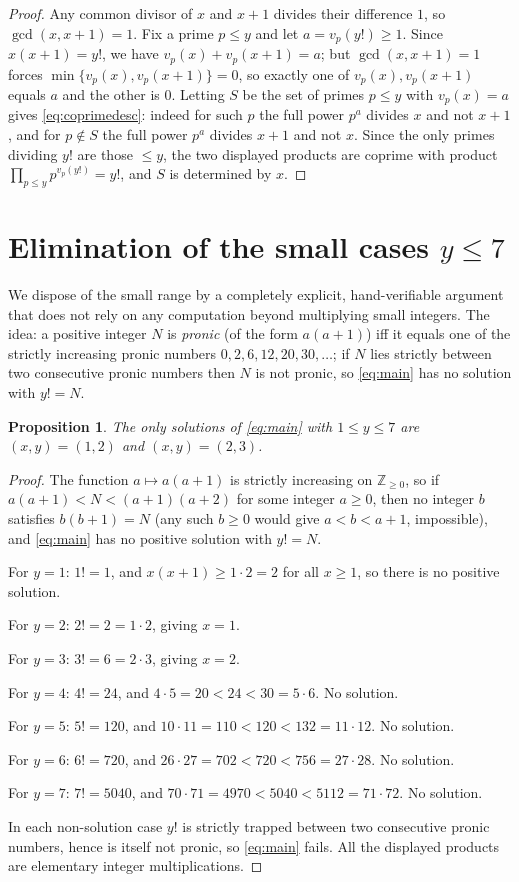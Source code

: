 \documentclass{amsart}
\theoremstyle{plain}
\newtheorem{proposition}{Proposition}
\theoremstyle{remark}
\begin{document}
\begin{proof}
Any common divisor of $x$ and $x+1$ divides their difference $1$, so
$\gcd(x,x+1)=1$.  Fix a prime $p\le y$ and let $a=v_p(y!)\ge1$.  Since
$x(x+1)=y!$, we have $v_p(x)+v_p(x+1)=a$; but $\gcd(x,x+1)=1$ forces
$\min\{v_p(x),v_p(x+1)\}=0$, so exactly one of $v_p(x),v_p(x+1)$ equals $a$
and the other is $0$.  Letting $S$ be the set of primes $p\le y$ with
$v_p(x)=a$ gives \eqref{eq:coprimedesc}: indeed for such $p$ the full power
$p^a$ divides $x$ and not $x+1$, and for $p\notin S$ the full power $p^a$
divides $x+1$ and not $x$. Since the only primes dividing $y!$ are those
$\le y$, the two displayed products are coprime with product
$\prod_{p\le y}p^{v_p(y!)}=y!$, and $S$ is determined by $x$.
\end{proof}

\section{Elimination of the small cases $y\le 7$}\label{sec:small}

We dispose of the small range by a completely explicit, hand-verifiable
argument that does not rely on any computation beyond multiplying small
integers.  The idea: a positive integer $N$ is \emph{pronic} (of the form
$a(a+1)$) iff it equals one of the strictly increasing pronic numbers
$0,2,6,12,20,30,\dots$; if $N$ lies strictly between two consecutive pronic
numbers then $N$ is not pronic, so \eqref{eq:main} has no solution with
$y!=N$.

\begin{proposition}\label{prop:small}
The only solutions of \eqref{eq:main} with $1\le y\le 7$ are $(x,y)=(1,2)$
and $(x,y)=(2,3)$.
\end{proposition}

\begin{proof}
The function $a\mapsto a(a+1)$ is strictly increasing on $\mathbb{Z}_{\ge0}$,
so if $a(a+1)<N<(a+1)(a+2)$ for some integer $a\ge0$, then no integer $b$
satisfies $b(b+1)=N$ (any such $b\ge0$ would give $a<b<a+1$, impossible),
and \eqref{eq:main} has no positive solution with $y!=N$.

For $y=1$: $1!=1$, and $x(x+1)\ge 1\cdot2=2$ for all $x\ge1$, so there is no
positive solution.

For $y=2$: $2!=2=1\cdot2$, giving $x=1$.

For $y=3$: $3!=6=2\cdot3$, giving $x=2$.

For $y=4$: $4!=24$, and $4\cdot5=20<24<30=5\cdot6$. No solution.

For $y=5$: $5!=120$, and $10\cdot11=110<120<132=11\cdot12$. No solution.

For $y=6$: $6!=720$, and $26\cdot27=702<720<756=27\cdot28$. No solution.

For $y=7$: $7!=5040$, and $70\cdot71=4970<5040<5112=71\cdot72$. No solution.

In each non-solution case $y!$ is strictly trapped between two consecutive
pronic numbers, hence is itself not pronic, so \eqref{eq:main} fails.  All
the displayed products are elementary integer multiplications.
\end{proof}
\end{document}
